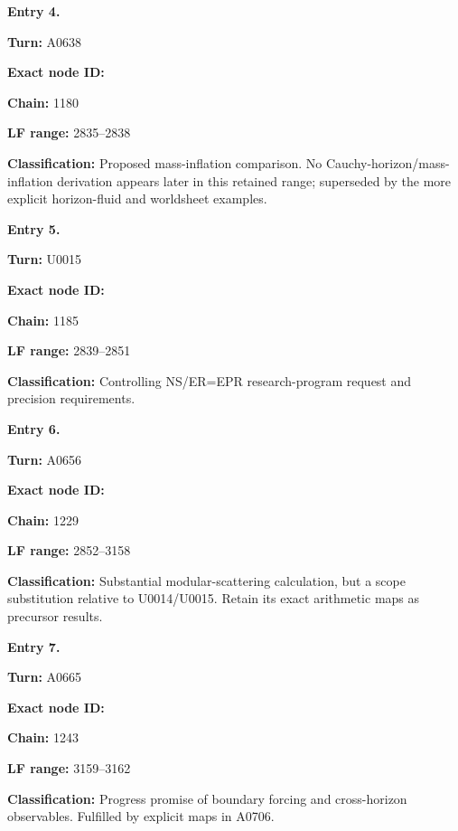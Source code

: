 \documentclass[10pt,a4paper,oneside]{report}
\begin{document}

\textbf{Entry 4.}

\textbf{Turn:} A0638

\textbf{Exact node ID:}
\protect{}

\textbf{Chain:} 1180

\textbf{LF range:} 2835--2838

\textbf{Classification:} Proposed mass-inflation comparison. No
Cauchy-horizon/mass-inflation derivation appears later in this retained
range; superseded by the more explicit horizon-fluid and worldsheet
examples.


\textbf{Entry 5.}

\textbf{Turn:} U0015

\textbf{Exact node ID:}
\protect{}

\textbf{Chain:} 1185

\textbf{LF range:} 2839--2851

\textbf{Classification:} Controlling NS/ER=EPR research-program request
and precision requirements.


\textbf{Entry 6.}

\textbf{Turn:} A0656

\textbf{Exact node ID:}
\protect{}

\textbf{Chain:} 1229

\textbf{LF range:} 2852--3158

\textbf{Classification:} Substantial modular-scattering calculation, but
a scope substitution relative to U0014/U0015. Retain its exact
arithmetic maps as precursor results.


\textbf{Entry 7.}

\textbf{Turn:} A0665

\textbf{Exact node ID:}
\protect{}

\textbf{Chain:} 1243

\textbf{LF range:} 3159--3162

\textbf{Classification:} Progress promise of boundary forcing and
cross-horizon observables. Fulfilled by explicit maps in A0706.

\end{document}
